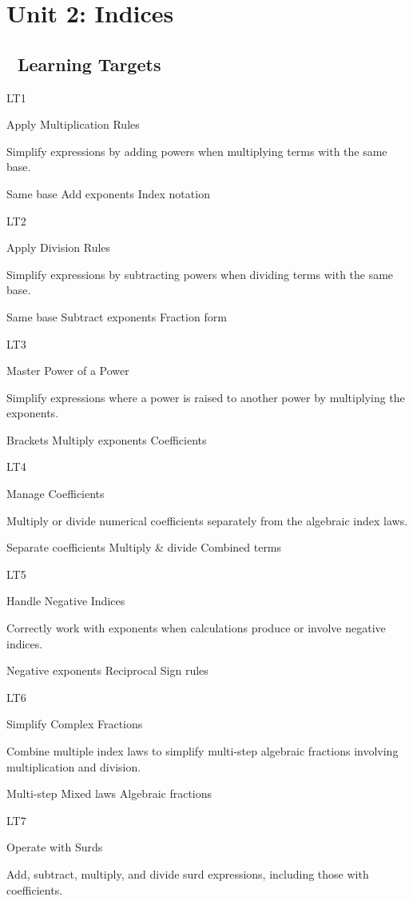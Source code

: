 \documentclass[
  letterpaper,
  DIV=11,
  numbers=noendperiod]{scrreprt}
\theoremstyle{definition}
\theoremstyle{remark}
\begin{document}
\chapter{Unit 2: Indices}\label{unit-2-indices}

\section{🎯 Learning Targets}\label{learning-targets-1}

LT1

Apply Multiplication Rules

Simplify expressions by adding powers when multiplying terms with the
same base.

{Same base} {Add exponents} {Index notation}

LT2

Apply Division Rules

Simplify expressions by subtracting powers when dividing terms with the
same base.

{Same base} {Subtract exponents} {Fraction form}

LT3

Master Power of a Power

Simplify expressions where a power is raised to another power by
multiplying the exponents.

{Brackets} {Multiply exponents} {Coefficients}

LT4

Manage Coefficients

Multiply or divide numerical coefficients separately from the algebraic
index laws.

{Separate coefficients} {Multiply \& divide} {Combined terms}

LT5

Handle Negative Indices

Correctly work with exponents when calculations produce or involve
negative indices.

{Negative exponents} {Reciprocal} {Sign rules}

LT6

Simplify Complex Fractions

Combine multiple index laws to simplify multi-step algebraic fractions
involving multiplication and division.

{Multi-step} {Mixed laws} {Algebraic fractions}

LT7

Operate with Surds

Add, subtract, multiply, and divide surd expressions, including those
with coefficients.
\end{document}
